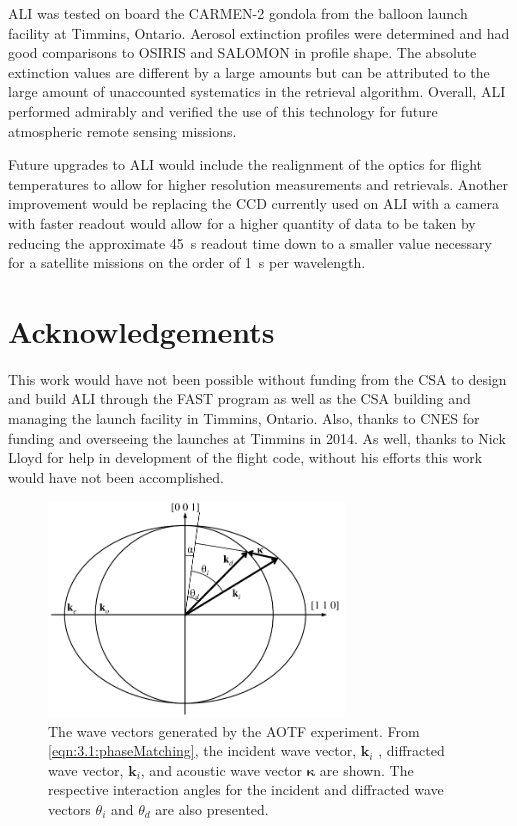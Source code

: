 \documentclass[12pt]{article}
\begin{document}
ALI was tested on board the CARMEN-2 gondola from the balloon launch facility at Timmins, Ontario. Aerosol extinction profiles were determined and had good comparisons to OSIRIS and SALOMON in profile shape. The absolute extinction values are different by a large amounts but can be attributed to the large amount of unaccounted systematics in the retrieval algorithm. Overall, ALI performed admirably and verified the use of this technology for future atmospheric remote sensing missions.

Future upgrades to ALI would include the realignment of the optics for flight temperatures to allow for higher resolution measurements and retrievals. Another improvement would be replacing the CCD currently used on ALI with a camera with faster readout would allow for a higher quantity of data to be taken by reducing the approximate 45~s readout time down to a smaller value necessary for a satellite missions on the order of 1~s per wavelength.

\section{Acknowledgements}

This work would have not been possible without funding from the CSA to design and build ALI through the FAST program as well as the CSA building and managing the launch facility in Timmins, Ontario. Also, thanks to CNES for funding and overseeing the launches at Timmins in 2014. As well, thanks to Nick Lloyd for help in development of the flight code, without his efforts this work would have not been accomplished.




\clearpage

\begin{figure}
    \begin{center}
    \includegraphics[width=0.7\textwidth]{./Images/3-1-AOTFWavevectorWithRefraction.pdf}
    \caption{The wave vectors generated by the AOTF experiment. From \autoref{eqn:3.1:phaseMatching}, the incident wave vector, $\mathbf{k}_{i}$ , diffracted wave vector, $\mathbf{k}_{i}$, and acoustic wave vector $\boldsymbol\kappa$ are shown. The respective interaction angles for the incident and diffracted wave vectors $\theta_{i}$ and $\theta_{d}$ are also presented.}
    \label{fig:3.1:ATOFWavevectors}
    \end{center}
\end{figure}
\end{document}
